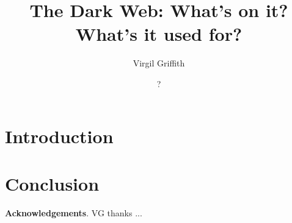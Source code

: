 \documentclass[12pt, final]{article}
\author{Virgil Griffith}
\author{?}
\affil{School of Computing, National University of Singapore, Singapore}
\title{The Dark Web: What's on it?  What's it used for?}
\begin{document}
\maketitle

\begin{abstract}
\end{abstract}

\section{Introduction}

\section{Conclusion}

\textbf{Acknowledgements}.  VG thanks ...


\end{document}
